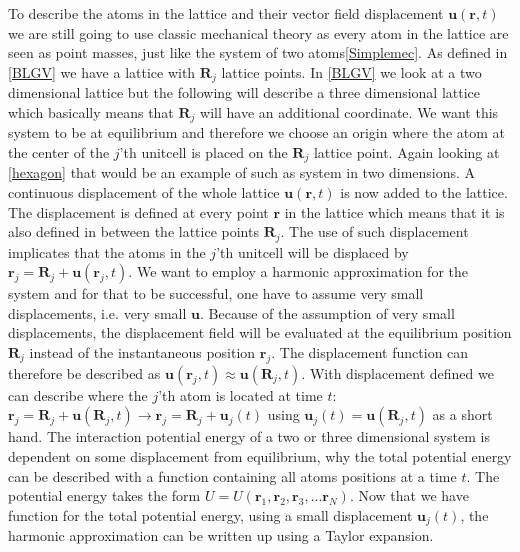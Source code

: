 To describe the atoms in the lattice and their vector field displacement $\mathbf{u}(\mathbf{r},t)$ we are still going to use classic mechanical theory as every atom in the lattice are seen as point masses, just like the system of two atoms\cref{Simplemec}. As defined in \cref{BLGV} we have a lattice with $\mathbf{R}_{j}$ lattice points. In \cref{BLGV} we look at a two dimensional lattice but the following will describe a three dimensional lattice which basically means that $\mathbf{R}_{j}$ will have an additional coordinate. We want this system to be at equilibrium and therefore we choose an origin where the atom at the center of the $j$'th unitcell is placed on the $\mathbf{R}_{j}$ lattice point. Again looking at \cref{hexagon} that would be an example of such as system in two dimensions. A continuous displacement of the whole lattice $\mathbf{u}(\mathbf{r},t)$ is now added to the lattice. The displacement is defined at every point $\mathbf{r}$ in the lattice which means that it is also defined in between the lattice points $\mathbf{R}_{j}$. The use of such displacement implicates that the atoms in the $j$'th unitcell will be displaced by $\mathbf{r}_{j}=\mathbf{R}_{j}+\mathbf{u}(\mathbf{r}_{j},t)$. We want to employ a harmonic approximation for the system and for that to be successful, one have to assume very small displacements, i.e. very small $\mathbf{u}$. Because of the assumption of very small displacements, the displacement field will be evaluated at the equilibrium position $\mathbf{R}_{j}$ instead of the instantaneous position $\mathbf{r}_{j}$. The displacement function can therefore be described as $\mathbf{u}(\mathbf{r}_{j},t)\approx \mathbf{u}(\mathbf{R}_{j},t)$. With displacement defined we can describe where the $j$'th atom is located at time $t$: $\mathbf{r}_{j}=\mathbf{R}_{j}+\mathbf{u}(\mathbf{R}_{j},t)\rightarrow \mathbf{r}_{j}=\mathbf{R}_{j}+\mathbf{u}_{j}(t)$ using $\mathbf{u}_{j}(t)=\mathbf{u}(\mathbf{R}_{j},t)$ as a short hand. The interaction potential energy of a two or three dimensional system is dependent on some displacement from equilibrium, why the total potential energy can be described with a function containing all atoms positions at a time $t$. The potential energy takes the form $U=U(\mathbf{r}_{1},\mathbf{r}_{2},\mathbf{r}_{3},...\mathbf{r}_{N})$. Now that we have function for the total potential energy, using a small displacement $\mathbf{u}_{j}(t)$, the harmonic approximation can be written up using a Taylor expansion.\begin{align}

\end{align}
